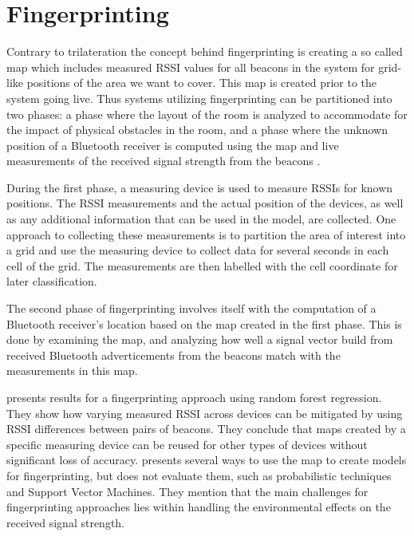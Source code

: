 \section{Fingerprinting}\label{sec:fingerprinting}
Contrary to trilateration the concept behind fingerprinting is creating a so called map which includes measured RSSI values for all beacons in the system for grid-like positions of the area we want to cover.
This map is created prior to the system going live.
Thus systems utilizing fingerprinting can be partitioned into two phases: a phase where the layout of the room is analyzed to accommodate for the impact of physical obstacles in the room, and a phase where the unknown position of a Bluetooth receiver is computed using the map and live measurements of the received signal strength from the beacons \cite{presence_ble_review, taking_localization_to_the_wild}.

During the first phase, a measuring device is used to measure RSSIs for known positions.
The RSSI measurements and the actual position of the devices, as well as any additional information that can be used in the model, are collected. 
One approach to collecting these measurements is to partition the area of interest into a grid and use the measuring device to collect data for several seconds in each cell of the grid.\cite{improving_indoor_localization}
The measurements are then labelled with the cell coordinate for later classification.

The second phase of fingerprinting involves itself with the computation of a Bluetooth receiver's location based on the map created in the first phase. 
This is done by examining the map, and analyzing how well a signal vector build from received Bluetooth adverticements from the beacons match with the measurements in this map.

\citeauthor{taking_localization_to_the_wild} \cite{taking_localization_to_the_wild} presents results for a fingerprinting approach using random forest regression.
They show how varying measured RSSI across devices can be mitigated by using RSSI differences between pairs of beacons.
They conclude that maps created by a specific measuring device can be reused for other types of devices without significant loss of accuracy. 
\citeauthor{presence_ble_review}\cite{presence_ble_review} presents several ways to use the map to create models for fingerprinting, but does not evaluate them, such as probabilistic techniques and Support Vector Machines. 
They mention that the main challenges for fingerprinting approaches lies within handling the environmental effects on the received signal strength.

